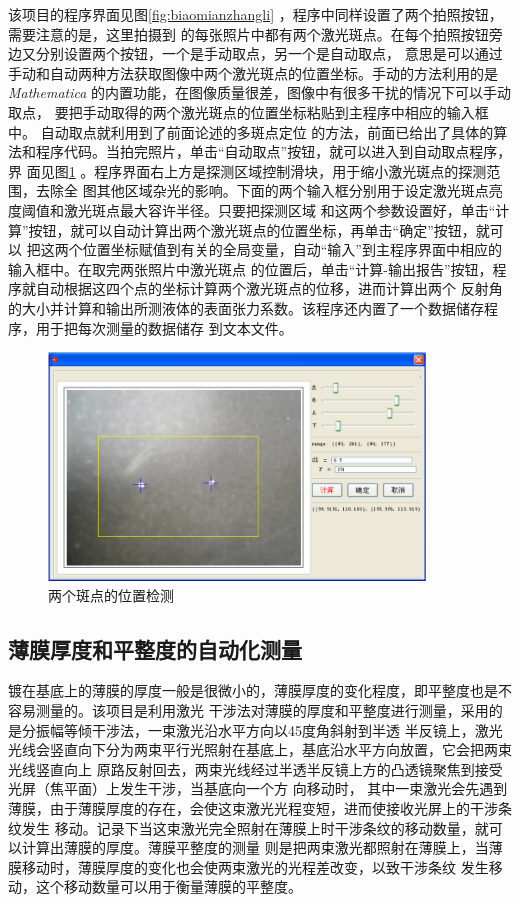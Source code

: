 \documentclass[UTF8,a4paper,12pt]{article}
\begin{document}
该项目的程序界面见图\;\ref{fig:biaomianzhangli} ，程序中同样设置了两个拍照按钮，需要注意的是，这里拍摄到
的每张照片中都有两个激光斑点。在每个拍照按钮旁边又分别设置两个按钮，一个是手动取点，另一个是自动取点，
意思是可以通过手动和自动两种方法获取图像中两个激光斑点的位置坐标。手动的方法利用的是\textit{Mathematica}
的内置功能，在图像质量很差，图像中有很多干扰的情况下可以手动取点，
要把手动取得的两个激光斑点的位置坐标粘贴到主程序中相应的输入框中。
自动取点就利用到了前面论述的多斑点定位
的方法，前面已给出了具体的算法和程序代码。当拍完照片，单击``自动取点''按钮，就可以进入到自动取点程序，界
面见图\;\ref{fig:twospots-detect} 。程序界面右上方是探测区域控制滑块，用于缩小激光斑点的探测范围，去除全
图其他区域杂光的影响。下面的两个输入框分别用于设定激光斑点亮度阈值和激光斑点最大容许半径。只要把探测区域
和这两个参数设置好，单击``计算''按钮，就可以自动计算出两个激光斑点的位置坐标，再单击``确定''按钮，就可以
把这两个位置坐标赋值到有关的全局变量，自动``输入''到主程序界面中相应的输入框中。在取完两张照片中激光斑点
的位置后，单击``计算-输出报告''按钮，程序就自动根据这四个点的坐标计算两个激光斑点的位移，进而计算出两个
反射角的大小并计算和输出所测液体的表面张力系数。该程序还内置了一个数据储存程序，用于把每次测量的数据储存
到文本文件。

\begin{figure}[htbp]
\centering
\includegraphics[width=100mm]{image/twospots-detect.pdf}
\caption{两个斑点的位置检测}\label{fig:twospots-detect}
\end{figure}


\subsection{薄膜厚度和平整度的自动化测量}

镀在基底上的薄膜的厚度一般是很微小的，薄膜厚度的变化程度，即平整度也是不容易测量的。该项目是利用激光
干涉法对薄膜的厚度和平整度进行测量，采用的是分振幅等倾干涉法，一束激光沿水平方向以45度角斜射到半透
半反镜上，激光光线会竖直向下分为两束平行光照射在基底上，基底沿水平方向放置，它会把两束光线竖直向上
原路反射回去，两束光线经过半透半反镜上方的凸透镜聚焦到接受光屏（焦平面）上发生干涉，当基底向一个方
向移动时，
其中一束激光会先遇到薄膜，由于薄膜厚度的存在，会使这束激光光程变短，进而使接收光屏上的干涉条纹发生
移动。记录下当这束激光完全照射在薄膜上时干涉条纹的移动数量，就可以计算出薄膜的厚度。薄膜平整度的测量
则是把两束激光都照射在薄膜上，当薄膜移动时，薄膜厚度的变化也会使两束激光的光程差改变，以致干涉条纹
发生移动，这个移动数量可以用于衡量薄膜的平整度。
\end{document}
